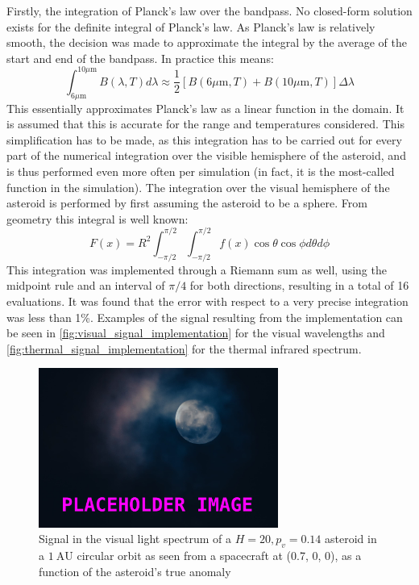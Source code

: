 Firstly, the integration of Planck's law over the bandpass. No closed-form solution exists for the definite integral of Planck's law. As Planck's law is relatively smooth, the decision was made to approximate the integral by the average of the start and end of the bandpass. In practice this means:
\begin{equation}
 \int _{6 \mu\mathrm{m}}^{10 \mu\mathrm{m}} B(\lambda, T) d\lambda \approx \frac{1}{2}\left[B(6 \mu\mathrm{m}, T) + B(10 \mu\mathrm{m}, T)\right] \Delta \lambda
\end{equation}
This essentially approximates Planck's law as a linear function in the domain. It is assumed that this is accurate for the range and temperatures considered. This simplification has to be made, as this integration has to be carried out for every part of the numerical integration over the visible hemisphere of the asteroid, and is thus performed even more often per simulation (in fact, it is the most-called function in the simulation). The integration over the visual hemisphere of the asteroid is performed by first assuming the asteroid to be a sphere. From geometry this integral is well known:
\begin{equation}
 F(x) = R^2\int_{-\pi/2}^{\pi/2}\int_{-\pi/2}^{\pi/2} f(x) \cos \theta \cos \phi d \theta d \phi
\end{equation}
This integration was implemented through a Riemann sum as well, using the midpoint rule and an interval of $\pi/4$ for both directions, resulting in a total of 16 evaluations. It was found that the error with respect to a very precise integration was less than 1\%. Examples of the signal resulting from the implementation can be seen in \autoref{fig:visual_signal_implementation} for the visual wavelengths and \autoref{fig:thermal_signal_implementation} for the thermal infrared spectrum.

\begin{figure}[htbp]
 \centering
 \includegraphics[width=0.7\textwidth]{img/implementation_vis_signal.png}
 \caption{Signal in the visual light spectrum of a $H=20, p_v=0.14$ asteroid in a $1~\mathrm{AU}$ circular orbit as seen from a spacecraft at (0.7, 0, 0), as a function of the asteroid's true anomaly}
 \label{fig:visual_signal_implementation}
\end{figure}


